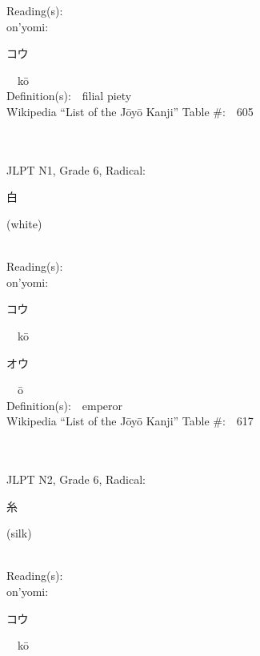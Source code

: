 \begin{multicols}{2}
Reading(s):\ \ \\
{\hspace*{1em}}on'yomi:\ \ \\
{\hspace*{2em}}{\begin{CJK}{UTF8}{min} コウ \end{CJK}}\ \ k\=o\ \ \\
Definition(s):\ \ filial piety \\
Wikipedia ``List of the J\=oy\=o Kanji'' Table \#:\ \ 605 \\
\ \ \\
{\fontsize{34pt}{40pt}  }\ \ \\  %
{JLPT N1, Grade 6, Radical:\ \ {\begin{CJK}{UTF8}{min} 白 \end{CJK}} (white) } \\
Reading(s):\ \ \\
{\hspace*{1em}}on'yomi:\ \ \\
{\hspace*{2em}}{\begin{CJK}{UTF8}{min} コウ \end{CJK}}\ \ k\=o\ \ \\
{\hspace*{2em}}{\begin{CJK}{UTF8}{min} オウ \end{CJK}}\ \ \=o\ \ \\
Definition(s):\ \ emperor \\
Wikipedia ``List of the J\=oy\=o Kanji'' Table \#:\ \ 617 \\
\ \ \\
{\fontsize{34pt}{40pt}  }\ \ \\  %
{JLPT N2, Grade 6, Radical:\ \ {\begin{CJK}{UTF8}{min} 糸 \end{CJK}} (silk) } \\
Reading(s):\ \ \\
{\hspace*{1em}}on'yomi:\ \ \\
{\hspace*{2em}}{\begin{CJK}{UTF8}{min} コウ \end{CJK}}\ \ k\=o\ \ \\

\end{multicols}
